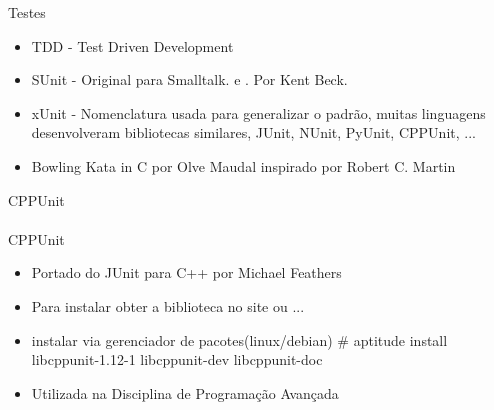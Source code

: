\documentclass[10pt,a4paper]{beamer}
\begin{document}
	\begin{frame}{Testes}
		\begin{itemize}
			\item TDD - Test Driven Development \cite{Beck:2002:TDD:579193}
			\pause
			\item SUnit - Original para Smalltalk. \cite{wiki:sunit:01} e \cite{wiki:smalltalk:01}. Por Kent Beck. \cite{beck1999kent}
			\pause
			\item xUnit - Nomenclatura usada para generalizar o padrão, muitas linguagens desenvolveram bibliotecas similares, JUnit, NUnit, PyUnit, CPPUnit, ... \cite{WikipediaXUnit:01}
			\pause
			\item Bowling Kata in C por Olve Maudal \cite{OlveMaudal:01} inspirado por Robert C. Martin \cite{RobertCMartin:01}
		\end{itemize}
	\end{frame}  

	\begin{frame}{CPPUnit}
		\paragraph{}
		CPPUnit
		\begin{itemize}
			\item Portado do JUnit para C++ por Michael Feathers \cite{MichaelFeathers:01}
			\pause
			\item Para instalar obter a biblioteca no site \cite{MichaelFeathers:02} ou ...
			\pause
			\item instalar via gerenciador de pacotes(linux/debian) \linebreak
			\# aptitude install libcppunit-1.12-1 libcppunit-dev libcppunit-doc
			\pause
			\item Utilizada na Disciplina de Programação Avançada \cite{Ementarios:CABS001}
		\end{itemize}
	\end{frame}  
\end{document}
